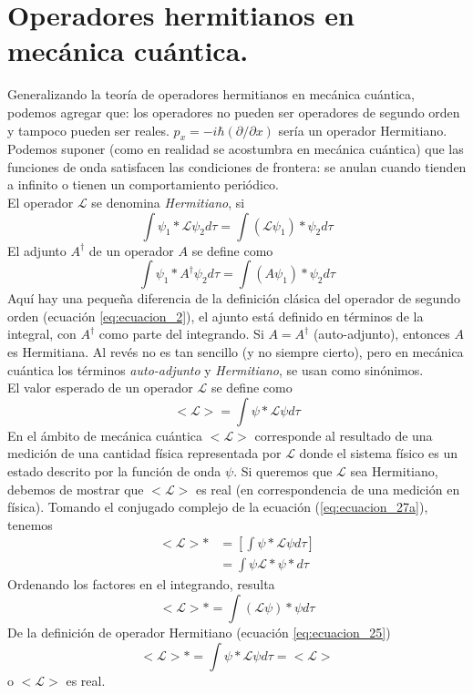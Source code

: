\section{Operadores hermitianos en mecánica cuántica.}
Generalizando la teoría de operadores hermitianos en mecánica cuántica, podemos agregar que: los operadores no pueden ser operadores de segundo orden y tampoco pueden ser reales. $p_{x} = - i \hbar(\partial / \partial x)$ sería un operador Hermitiano.
\\
Podemos suponer (como en realidad se acostumbra en mecánica cuántica) que las funciones de onda satisfacen las condiciones de frontera: se anulan cuando tienden a infinito o tienen un comportamiento periódico.
\\
El operador $\mathscr{L}$ se denomina \emph{Hermitiano}, si
\begin{equation}
\int \psi_{1}* \mathscr{L} \psi_{2} d \tau =  \int (\mathscr{L} \psi_{1})* \psi_{2} d \tau
\label{eq:ecuacion_25}
\end{equation}
El adjunto $A^{\dagger}$ de un operador $A$ se define como 
\begin{equation}
\int \psi_{1}* A^{\dagger} \psi_{2} d \tau = \int (A \psi_{1})* \psi_{2} d \tau
\label{eq:ecuacion_26}
\end{equation}
Aquí hay una pequeña diferencia de la definición clásica del operador de segundo orden (ecuación \ref{eq:ecuacion_2}), el ajunto está definido en términos de la integral, con $A^{\dagger}$ como parte del integrando. Si $A=A^{\dagger}$ (auto-adjunto), entonces $A$ es Hermitiana. Al revés no es tan sencillo (y no siempre cierto), pero en mecánica cuántica los términos \emph{auto-adjunto} y \emph{Hermitiano}, se usan como sinónimos.
\\
El valor esperado de un operador $\mathscr{L}$ se define como
\begin{equation}
< \mathscr{L} > = \int	\psi* \mathscr{L} \psi d \tau
\label{eq:ecuacion_27a}
\end{equation}
En el ámbito de mecánica cuántica $< \mathscr{L} >$ corresponde al resultado de una medición de una cantidad física representada por $\mathscr{L}$ donde el sistema físico es un estado descrito por la función de onda $\psi$. Si queremos que $\mathscr{L}$ sea Hermitiano, debemos de mostrar que $<\mathscr{L}>$ es real (en correspondencia de una medición en física). Tomando el conjugado complejo de la ecuación (\ref{eq:ecuacion_27a}), tenemos
\[ \begin{split}
< \mathscr{L} >* &= \left[ \int \psi* \mathscr{L} \psi d \tau \right] \\
&= \int \psi \mathscr{L}* \psi * d \tau
\end{split} \]
Ordenando los factores en el integrando, resulta
\[ < \mathscr{L} >* = \int (\mathscr{L} \psi )* \psi d \tau \]
De la definición de operador Hermitiano (ecuación \ref{eq:ecuacion_25})
\begin{equation}
< \mathscr{L} >* = \int \psi* \mathscr{L} \psi d \tau = < \mathscr{L} > 
\label{eq:ecuacion_27b}
\end{equation}
o $< \mathscr{L} >$ es real.
